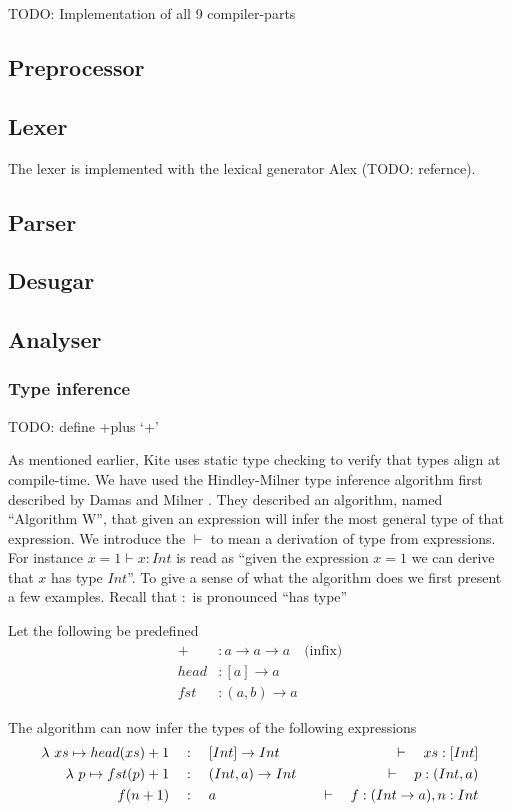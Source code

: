 
TODO: Implementation of all 9 compiler-parts

\subsection{Preprocessor}
\subsection{Lexer}
The lexer is implemented with the lexical generator Alex \cite{dornan01} (TODO: refernce).

\subsection{Parser}
\subsection{Desugar}
\subsection{Analyser}

\subsubsection{Type inference}

TODO: define +plus `+'

As mentioned earlier, Kite uses static type checking to verify that types align at compile-time. We have used the Hindley-Milner type inference algorithm first described by Damas and Milner \cite{milner82}. They described an algorithm, named ``Algorithm W'', that given an expression will infer the most general type of that expression. We introduce the $\vdash$ to mean a derivation of type from expressions. For instance $x = 1 \vdash x : Int$ is read as ``given the expression $x = 1$ we can derive that $x$ has type $Int$''. To give a sense of what the algorithm does we first present a few examples. Recall that $:$ is pronounced ``has type''

Let the following be predefined
\begin{align*}
  +      & : a \to a \to a   \quad\text{(infix)}\\
  head   & : [a] \to a   \\
  fst    & : (a, b) \to a
\end{align*}

The algorithm can now infer the types of the following expressions
\begin{align*}
  \lambda{} \ xs \mapsto{} head(xs) + 1 & \quad:\quad [Int] \to Int    & \quad\vdash\quad xs : [Int]             \\
  \lambda{} \ p \mapsto{} fst(p) + 1    & \quad:\quad (Int, a) \to Int & \quad\vdash\quad p : (Int, a)           \\
  f(n + 1)              & \quad:\quad a                & \quad\vdash\quad f: (Int \to a), n: Int \\
\end{align*}

